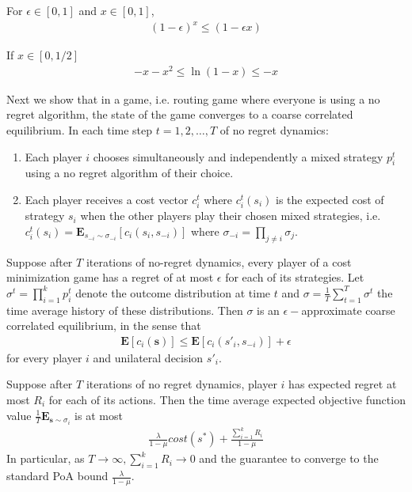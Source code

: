 \begin{lemma}
For $\epsilon \in [0,1]$ and $x \in [0,1]$, 
\begin{align*}
(1-\epsilon)^x \leq (1-\epsilon x)
\end{align*}\label{lemma:epsilon}
\end{lemma}

\begin{lemma}
If $x \in [0,1/2]$
\begin{align*}
-x-x^2 \leq \ln (1-x) \leq -x
\end{align*}\label{lemma:ln}
\end{lemma}
Next we show that in a game, i.e. routing game where everyone is using a no regret algorithm, the state of the game converges to a coarse correlated equilibrium. In each time step $t=1,2,\ldots, T$ of no regret dynamics:
\begin{enumerate}
\item Each player $i$ chooses simultaneously and independently a mixed strategy $p^t_i$ using a no regret algorithm of their choice.
\item Each player receives a cost vector $c^t_i$ where $c_i^t(s_i)$ is the expected cost of strategy $s_i$ when the other players play their chosen mixed strategies, i.e. $c^t_i(s_i)=\mathbf{E}_{s_{-i}\sim \sigma_{-i}}[c_i(s_i,s_{-i})]$ where $\sigma_{-i}=\prod_{j\neq i}\sigma_j$.
\end{enumerate}


\begin{thm}
Suppose after $T$ iterations of no-regret dynamics, every player of a cost minimization game has a regret of at most $\epsilon$ for each of its strategies. Let $\sigma^t=\prod_{i=1}^{k}p^t_i$ denote the outcome distribution at time $t$ and $\sigma=\frac{1}{T}\sum_{t=1}^{T}\sigma^t$ the time average history of these distributions. Then $\sigma$ is an $\epsilon-$approximate coarse correlated equilibrium, in the sense that 
\begin{align*}
\mathbf{E}[c_i(\mathbf{s})]\leq\mathbf{E}[c_i(s'_i,s_{-i})]+\epsilon
\end{align*}
for every player $i$ and unilateral decision $s'_i$.
\end{thm}


\begin{cor}
Suppose after $T$ iterations of no regret dynamics, player $i$ has expected regret at most $R_i$ for each of its actions. Then the time average expected objective function value $\frac{1}{T}\mathbf{E}_{\mathbf{s}\sim\sigma_i}$ is at most 
\begin{align*}
\frac{\lambda}{1-\mu} cost(s^\ast)+\frac{\sum_{i=1}^{k}R_i}{1-\mu}
\end{align*}
In particular, as $T \to \infty, \sum_{i=1}^{k}R_i\to 0$ and the guarantee to converge to the standard PoA bound $\frac{\lambda}{1-\mu}$.
\end{cor}
